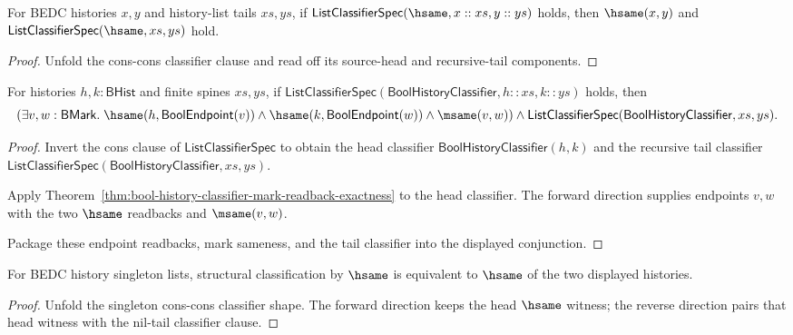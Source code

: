 \begin{theorem}
\label{thm:list-classifier-hsame-cons-inversion}
For BEDC histories $x,y$ and history-list tails $xs,ys$, if
$\mathsf{ListClassifierSpec}(\hsame,x::xs,y::ys)$ holds, then $\hsame(x,y)$
and $\mathsf{ListClassifierSpec}(\hsame,xs,ys)$ hold.
\end{theorem}
\begin{proof}
Unfold the cons-cons classifier clause and read off its source-head and
recursive-tail components.
\end{proof}


\begin{theorem}
\label{thm:list-bool-classifier-cons-mark-readback}
For histories $h,k:\mathsf{BHist}$ and finite spines $xs,ys$, if
$\mathsf{ListClassifierSpec}(\mathsf{BoolHistoryClassifier},h::xs,k::ys)$
holds, then
$$
(\exists v,w:\mathsf{BMark}.\;
\hsame(h,\mathsf{BoolEndpoint}(v)) \land
\hsame(k,\mathsf{BoolEndpoint}(w)) \land
\msame(v,w))
\land
\mathsf{ListClassifierSpec}(\mathsf{BoolHistoryClassifier},xs,ys).
$$
\end{theorem}
\begin{proof}
Invert the cons clause of $\mathsf{ListClassifierSpec}$ to obtain the head
classifier $\mathsf{BoolHistoryClassifier}(h,k)$ and the recursive tail
classifier $\mathsf{ListClassifierSpec}(\mathsf{BoolHistoryClassifier},xs,ys)$.

Apply Theorem~\ref{thm:bool-history-classifier-mark-readback-exactness} to
the head classifier. The forward direction supplies endpoints $v,w$ with the
two $\hsame$ readbacks and $\msame(v,w)$.

Package these endpoint readbacks, mark sameness, and the tail classifier into
the displayed conjunction.
\end{proof}

\begin{theorem}
\label{thm:list-classifier-hsame-singleton-iff}
For BEDC history singleton lists, structural classification by \(\hsame\) is
equivalent to \(\hsame\) of the two displayed histories.
\end{theorem}
\begin{proof}
Unfold the singleton cons-cons classifier shape. The forward direction keeps
the head \(\hsame\) witness; the reverse direction pairs that head witness with
the nil-tail classifier clause.
\end{proof}


